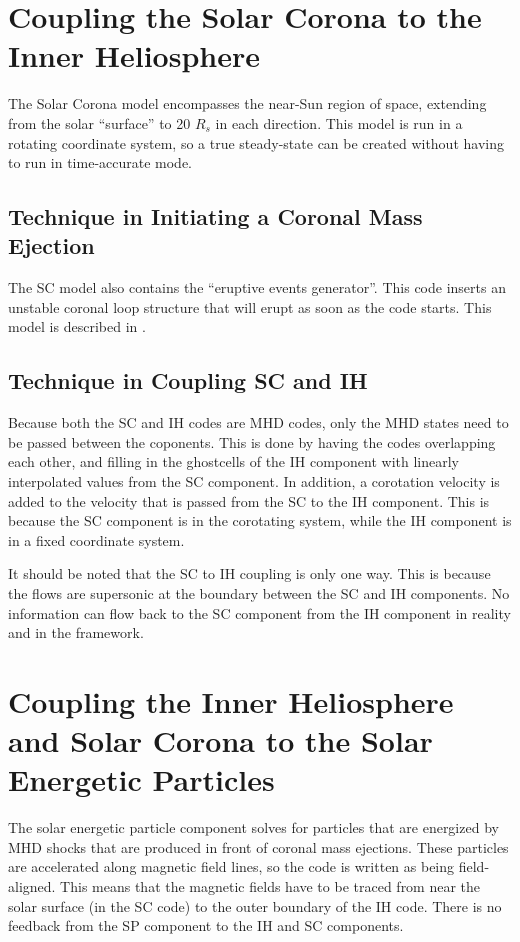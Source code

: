 \section{Coupling the Solar Corona to the Inner Heliosphere}

The Solar Corona model encompasses the near-Sun region of space,
extending from the solar ``surface'' to 20 $R_s$ in each direction.
This model is run in a rotating coordinate system, so a true
steady-state can be created without having to run in time-accurate
mode.

\subsection{Technique in Initiating a Coronal Mass Ejection}

The SC model also contains the ``eruptive events generator''.  This
code inserts an unstable coronal loop structure that will erupt as
soon as the code starts.  This model is described in
\cite{manchester_cme}.

\subsection{Technique in Coupling SC and IH}

Because both the SC and IH codes are MHD codes, only the MHD states
need to be passed between the coponents.  This is done by having the
codes overlapping each other, and filling in the ghostcells of the IH
component with linearly interpolated values from the SC component.  In
addition, a corotation velocity is added to the velocity that is
passed from the SC to the IH component.  This is because the SC
component is in the corotating system, while the IH component is in a
fixed coordinate system.

It should be noted that the SC to IH coupling is only one way.  This
is because the flows are supersonic at the boundary between the SC and
IH components.  No information can flow back to the SC component from
the IH component in reality and in the framework.

\section{Coupling the Inner Heliosphere and Solar Corona to the 
Solar Energetic Particles}

The solar energetic particle component solves for particles that are
energized by MHD shocks that are produced in front of coronal mass
ejections.  These particles are accelerated along magnetic field
lines, so the code is written as being field-aligned.  This means that
the magnetic fields have to be traced from near the solar surface (in
the SC code) to the outer boundary of the IH code.  There is no
feedback from the SP component to the IH and SC components.

